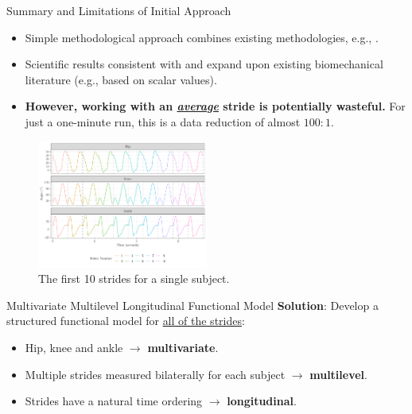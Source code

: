 \documentclass[aspectratio=128,xcolor=dvipsnames, notes]{beamer}
\newcommand{\1}{\mathbf{1}}
\begin{document}
\begin{frame}{Summary and Limitations of Initial Approach}
    \begin{itemize}
        \item Simple methodological approach combines existing methodologies, e.g., \textcite{morris_wavelet-based_2006, di_multilevel_2009, crainiceanu_bootstrap-based_2012}.
        \item Scientific results consistent with and expand upon existing biomechanical literature (e.g., based on scalar values).
        \item \textbf{However, working with an \underline{\textit{average}} stride is potentially wasteful.} For just a one-minute run, this is a data reduction of almost $100:1$.
    \end{itemize}
    \begin{figure}
        \centering
        \includegraphics[page = 1, width = 0.5\textwidth]{figures/RISC1-longitudinal-manuscript-code.pdf}
        \caption{The first 10 strides for a single subject.}
        \label{fig:enter-label}
    \end{figure}
\end{frame}

\begin{frame}{Multivariate Multilevel Longitudinal Functional Model \parencite{gunning_multivariate_2023}}
\large
\textbf{Solution}: Develop a structured functional model for \underline{all of the strides}:
\begin{itemize}
    \item Hip, knee and ankle $\rightarrow$ \textbf{multivariate}.
    \item Multiple strides measured bilaterally for each subject $\rightarrow$ \textbf{multilevel}.
    \item Strides have a natural time ordering $\rightarrow$ \textbf{longitudinal}.
\end{itemize}
\end{frame}
\end{document}
